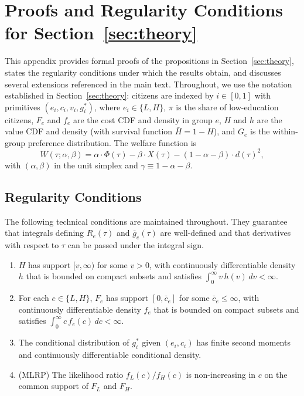 \section{Proofs and Regularity Conditions for Section~\ref{sec:theory}}
\label{sec:theory_proofs}

This appendix provides formal proofs of the propositions in Section~\ref{sec:theory}, states the regularity conditions under which the results obtain, and discusses several extensions referenced in the main text. Throughout, we use the notation established in Section~\ref{sec:theory}: citizens are indexed by $i \in [0, 1]$ with primitives $(e_i, c_i, v_i, g_i^*)$, where $e_i \in \{L, H\}$, $\pi$ is the share of low-education citizens, $F_e$ and $f_e$ are the cost CDF and density in group $e$, $H$ and $h$ are the value CDF and density (with survival function $\bar H = 1 - H$), and $G_e$ is the within-group preference distribution. The welfare function is
\[
W(\tau; \alpha, \beta) = \alpha \cdot \Phi(\tau) - \beta \cdot X(\tau) - (1 - \alpha - \beta) \cdot d(\tau)^2,
\]
with $(\alpha, \beta)$ in the unit simplex and $\gamma \equiv 1 - \alpha - \beta$.

\subsection{Regularity Conditions}
\label{ssec:proofs_regularity}

The following technical conditions are maintained throughout. They guarantee that integrals defining $R_e(\tau)$ and $\bar g_e(\tau)$ are well-defined and that derivatives with respect to $\tau$ can be passed under the integral sign.

\begin{regularitycondition}
\label{cond:regularity}
\begin{enumerate}
    \item[(a)] $H$ has support $[\underline v, \infty)$ for some $\underline v > 0$, with continuously differentiable density $h$ that is bounded on compact subsets and satisfies $\int_0^\infty v \, h(v)\, dv < \infty$.
    \item[(b)] For each $e \in \{L, H\}$, $F_e$ has support $[0, \bar c_e]$ for some $\bar c_e \leq \infty$, with continuously differentiable density $f_e$ that is bounded on compact subsets and satisfies $\int_0^\infty c \, f_e(c) \, dc < \infty$.
    \item[(c)] The conditional distribution of $g_i^*$ given $(e_i, c_i)$ has finite second moments and continuously differentiable conditional density.
    \item[(d)] (MLRP) The likelihood ratio $f_L(c)/f_H(c)$ is non-increasing in $c$ on the common support of $F_L$ and $F_H$.
\end{enumerate}
\end{regularitycondition}

